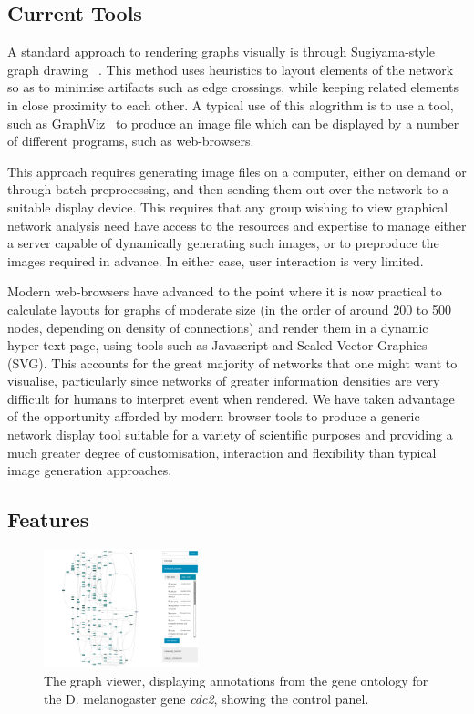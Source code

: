\documentclass[10pt,a4paper,twocolumn]{article}
\begin{document}
\subsection*{Current Tools}

A standard approach to rendering graphs visually is through Sugiyama-style 
graph drawing ~\cite{sugiyama}. This method uses heuristics to layout elements
of the network so as to minimise artifacts such as edge crossings, while keeping
related elements in close proximity to each other. A typical use of this 
alogrithm is to use a tool, such as GraphViz~\cite{graphviz}
to produce an image file which can be displayed by a number of different programs,
such as web-browsers.

This approach requires generating image files on a computer, either on demand
or through batch-preprocessing, and then sending them out over the network to
a suitable display device. This requires that any group wishing to view graphical
network analysis need have access to the resources and expertise to manage either
a server capable of dynamically generating such images, or to preproduce the
images required in advance. In either case, user interaction is very limited.

Modern web-browsers have advanced to the point where it is now practical to
calculate layouts for graphs of moderate size (in the order of around 200 to 500
nodes, depending on density of connections) and render them in a dynamic hyper-text
page, using tools such as Javascript and Scaled Vector Graphics (SVG). This accounts
for the great majority of networks that one might want to visualise, particularly
since networks of greater information densities are very difficult for humans to
interpret event when rendered. We have taken advantage of the opportunity afforded
by modern browser tools to produce a generic network display tool suitable for a
variety of scientific purposes and providing a much greater degree of customisation,
interaction and flexibility than typical image generation approaches.

\subsection*{Features}

\begin{figure}[htb]
\centering
\includegraphics[width=0.4\textwidth]{dagify.png}
\caption{\label{fig:1}The graph viewer, displaying annotations from the gene ontology for the D. melanogaster gene \emph{cdc2}, showing the control panel.}
\end{figure}
\end{document}

